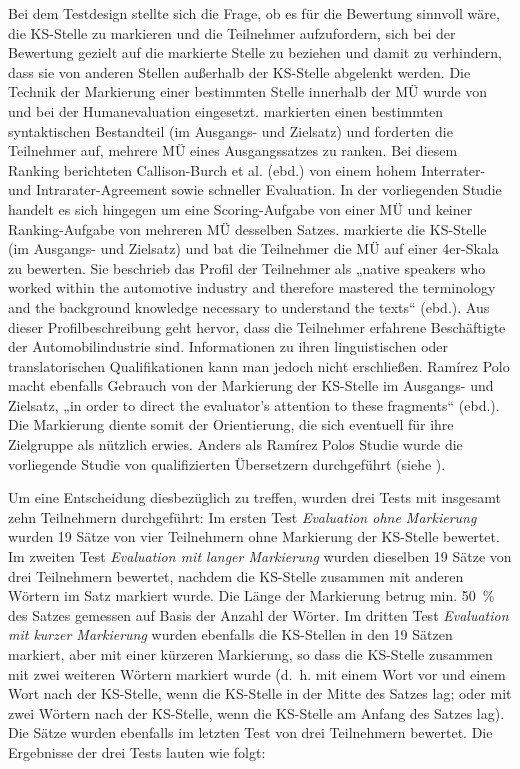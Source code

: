 
Bei dem Testdesign stellte sich die Frage, ob es für die Bewertung sinnvoll wäre, die KS-Stelle zu markieren und die Teilnehmer aufzufordern, sich bei der Bewertung gezielt auf die markierte Stelle zu beziehen und damit zu verhindern, dass sie von anderen Stellen außerhalb der KS-Stelle abgelenkt werden. Die Technik der Markierung einer bestimmten Stelle innerhalb der MÜ wurde von \citet{Callison-BurchEtAl2007} und \citet[236]{RamirezPolo2012} bei der Humanevaluation eingesetzt. \citet{Callison-BurchEtAl2007} markierten einen bestimmten syntaktischen Bestandteil (im Ausgangs- und Zielsatz) und forderten die Teilnehmer auf, mehrere MÜ eines Ausgangssatzes zu ranken. Bei diesem Ranking berichteten Callison-Burch et al. (ebd.) von einem hohem Interrater- und Intrarater-Agreement sowie schneller Evaluation. In der vorliegenden Studie handelt es sich hingegen um eine Scoring-Aufgabe von einer MÜ und keiner Ranking-Aufgabe von mehreren MÜ desselben Satzes. \citet[236]{RamirezPolo2012} markierte die KS-Stelle (im Ausgangs- und Zielsatz) und bat die Teilnehmer die MÜ auf einer 4er-Skala zu bewerten. Sie beschrieb das Profil der Teilnehmer als „native speakers who worked within the automotive industry and therefore mastered the terminology and the background knowledge necessary to understand the texts“ (ebd.). Aus dieser Profilbeschreibung geht hervor, dass die Teilnehmer erfahrene Beschäftigte der Automobilindustrie sind. Informationen zu ihren linguistischen oder translatorischen Qualifikationen kann man jedoch nicht erschließen. Ramírez Polo macht ebenfalls Gebrauch von der Markierung der KS-Stelle im Ausgangs- und Zielsatz, „in order to direct the evaluator's attention to these fragments“ (ebd.). Die Markierung diente somit der Orientierung, die sich eventuell für ihre Zielgruppe als nützlich erwies. Anders als Ramírez Polos Studie wurde die vorliegende Studie von qualifizierten Übersetzern durchgeführt (siehe ).

Um eine Entscheidung diesbezüglich zu treffen, wurden drei Tests mit insgesamt zehn Teilnehmern durchgeführt: Im ersten Test \textit{Evaluation ohne Markierung} wurden 19 Sätze von vier Teilnehmern ohne Markierung der KS-Stelle bewertet. Im zweiten Test \textit{Evaluation mit langer Markierung} wurden dieselben 19 Sätze von drei Teilnehmern bewertet, nachdem die KS-Stelle zusammen mit anderen Wörtern im Satz markiert wurde. Die Länge der Markierung betrug min. 50~\% des Satzes gemessen auf Basis der Anzahl der Wörter. Im dritten Test \textit{Evaluation mit kurzer Markierung} wurden ebenfalls die KS-Stellen in den 19 Sätzen markiert, aber mit einer kürzeren Markierung, so dass die KS-Stelle zusammen mit zwei weiteren Wörtern markiert wurde (d.~h. mit einem Wort vor und einem Wort nach der KS-Stelle, wenn die KS-Stelle in der Mitte des Satzes lag; oder mit zwei Wörtern nach der KS-Stelle, wenn die KS-Stelle am Anfang des Satzes lag). Die Sätze wurden ebenfalls im letzten Test von drei Teilnehmern bewertet. Die Ergebnisse der drei Tests lauten wie folgt:


